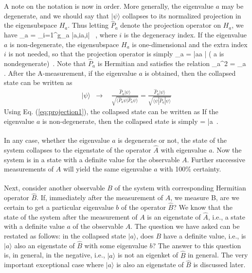 A note on the notation is now in order. More generally, the eigenvalue $a$ may be degenerate, and  we should say that 
 $|\psi\rangle$ collapses to its normalized projection in the eigensubspace $H_a$. Thus letting $\hat{P}_a$ denote the projection operator on $H_a$, we have
\be
 _a = \sum_{i=1}^{g_a} |a,i\rangle \langle a,i| \, , 
\label{eq:projection1}
\ee
where $i$ is the degeneracy index.  If the eigenvalue $a$ is non-degenerate,  the eigensubspace $H_a$ is
one-dimensional and the extra index $i$ is not needed, so that the projection operator is simply
\be
{}_a = |a\rangle \langle a | \quad ( a\; {\rm is\; nondegenerate})\, . 
\ee
Note that $\hat{P}_a$ is Hermitian and satisfies the relation
\be
{}_a^2 = _a\, .
\ee
After the A-measurement, if the eigenvalue $a$ is obtained, then the collapsed state can be written as
\begin{eqnarray}
|\psi\rangle & \longrightarrow & 
~~\frac{\hat{P}_a|\psi\rangle}{\sqrt{\langle\hat{P}_a\psi|\hat{P}_a\psi\rangle}} =
	\frac{\hat{P}_a|\psi\rangle}{\sqrt{\langle\psi|\hat{P}_a|\psi\rangle}}
\end{eqnarray}	
Using Eq. (\ref{eq:projection1}), the collapsed state can be written as
\be
\psi \longrightarrow \; 
                            { }
\ee			
If the eigenvalue $a$ is non-degenerate, then the collapsed state is simply
\be											
\psi \longrightarrow \; 
                            { } = |a\rangle\, .
\ee

\paragraph{}
In any case, whether the eigenvalue $a$ is degenerate or not, the state of the system collapses to the eigenstate of 
the operator $\hat{A}$ with eigenvalue $a$. Now the system is in a state with a definite value for the observable $A$. Further successive measurements of $A$ will yield the same eigenvalue $a$ with 100\% certainty. 

\paragraph{}
Next, consider another observable $B$ of the system with corresponding Hermitian operator $\hat{B}$. If, immediately after the  measurement of $A$, we measure B, are we certain to get a particular eigenvalue $b$ of the operator $\hat{B}$?
We know that the state of the system after the measurement of $A$ is an eigenstate of $\hat{A}$, i.e., a state with a definite value $a$ of the observable $A$. The question we have asked can be restated as follows: in the collapsed state
$|a\rangle$, does $B$ have a definite value, i.e., is $|a\rangle$ also an eigenstate of $\hat{B}$  with some eigenvalue $b$? The answer to this question is, in general, in the negative, i.e., $|a\rangle$ is not an eigenket of $\hat{B}$ in general. The very important exceptional case 
where $|a\rangle$ is also an eigenstate of $\hat{B}$ is discussed later.

